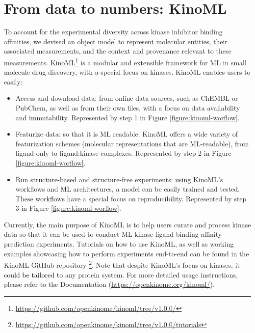 \documentclass[9pt,lessons]{livecoms}
\newcommand{\revision}[1]{\textcolor{black}{#1}}
\begin{document}

\section{From data to numbers: KinoML}

To account for the experimental diversity across kinase inhibitor binding affinities, we devised an object model to represent molecular entities, their associated measurements, and the context and provenance relevant to these measurements. KinoML\footnote{\url{https://github.com/openkinome/kinoml/tree/v1.0.0/}} is a modular and extensible framework for ML in small molecule drug discovery, with a special focus on kinases. KinoML enables users to easily:
\begin{itemize}
    \item  Access and download data: from online data sources, such as ChEMBL or PubChem, as well as from their own files, with a focus on data availability and immutability. Represented by step 1 in Figure \ref{figure:kinoml-worflow}.
    \item Featurize data: so that it is ML readable. KinoML offers a wide variety of featurization schemes (molecular representations that are ML-readable), from ligand-only to ligand:kinase complexes. Represented by step 2 in Figure \ref{figure:kinoml-worflow}.
    \item Run structure-based and structure-free experiments: using KinoML's workflows and ML architectures, a model can be easily trained and tested. These workflows have a special focus on reproducibility. Represented by step 3 in Figure \ref{figure:kinoml-worflow}.
\end{itemize}
Currently, the main purpose of KinoML is to help users curate and process kinase data so that it can be used to conduct ML kinase-ligand binding affinity prediction experiments. Tutorials on how to use KinoML, as well as working examples showcasing how to perform experiments end-to-end can be found in the KinoML GitHub repository \footnote{\url{https://github.com/openkinome/kinoml/tree/v1.0.0/tutorials}}. Note that despite KinoML's focus on kinases, it \revision{could be tailored} to any protein system. For more detailed usage instructions, please refer to the Documentation (\url{https://openkinome.org/kinoml/}). \\
\end{document}
